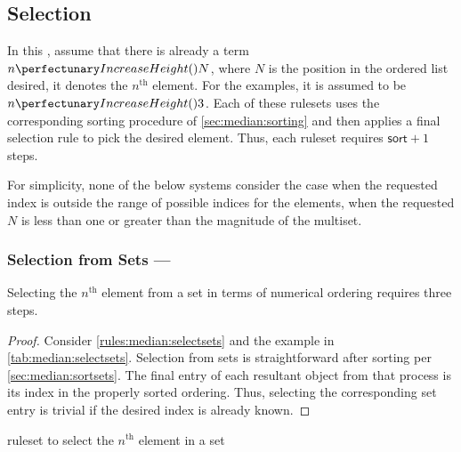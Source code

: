 \subsection{Selection}\label{sec:median:selection}

In this , assume that there is already a term \(\cpfunc{n}{N}\), where \(N\) is the position in the ordered list desired, \ie{} it denotes the \(n^{\text{th}}\) element.  For the examples, it is assumed to be \(\cpfunc{n}{3}\).  Each of these \glspl{ruleset} uses the corresponding sorting procedure of \cref{sec:median:sorting} and then applies a final selection rule to pick the desired element.  Thus, each \gls{ruleset} requires \(\textsf{sort} + 1\) steps.

For simplicity, none of the below systems consider the case when the requested index is outside the range of possible indices for the elements, \ie{} when the requested \(N\) is less than one or greater than the magnitude of the multiset.

\subsubsection{Selection from Sets --- }\label{sec:median:selectsets}

\begin{proposition}\label{prop:median:selectsets}
Selecting the \(n^{\text{th}}\) element from a set in terms of numerical ordering requires three steps.
\end{proposition}

\begin{proof}
Consider \cref{rules:median:selectsets} and the example in \cref{tab:median:selectsets}.  Selection from sets is straightforward after sorting per \cref{sec:median:sortsets}.  The final entry of each resultant object from that process is its index in the properly sorted ordering.  Thus, selecting the corresponding set entry is trivial if the desired index is already known.
\end{proof}

\begin{cprulesetfloat}
\begin{cpruleset}


\end{cpruleset}
\caption{\label{rules:median:selectsets}\Gls{ruleset} to select the \(n^{\text{th}}\) element in a set}
\end{cprulesetfloat}

